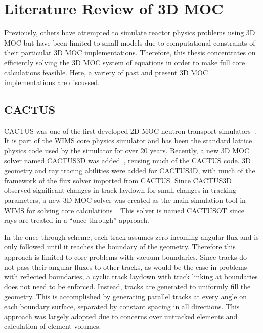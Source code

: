 \section{Literature Review of 3D MOC}
\label{sec:lit-review}

Previously, others have attempted to simulate reactor physics problems using 3D \ac{MOC} but have been limited to small models due to computational constraints of their particular 3D \ac{MOC} implementations. Therefore, this thesis concentrates on efficiently solving the 3D \ac{MOC} system of equations in order to make full core calculations feasible. Here, a variety of past and present 3D \ac{MOC} implementations are discussed.

\subsection{CACTUS}
\label{sec:cactus}

CACTUS was one of the first developed 2D \ac{MOC} neutron transport simulators~\cite{cactus_2d}. It is part of the WIMS core physics simulator and has been the standard lattice physics code used by the simulator for over 20 years. Recently, a new 3D \ac{MOC} solver named CACTUS3D was added~\cite{cactus_3d}, reusing much of the CACTUS code. 3D geometry and ray tracing abilities were added for CACTUS3D, with much of the framework of the flux solver imported from CACTUS. Since CACTUS3D observed significant changes in track laydown for small changes in tracking parameters, a new 3D \ac{MOC} solver was created as the main simulation tool in WIMS for solving core calculations~\cite{cactus_wims}. This solver is named  CACTUSOT since rays are treated in a ``once-through'' approach.

In the once-through scheme, each track assumes zero incoming angular flux and is only followed until it reaches the boundary of the geometry. Therefore this approach is limited to core problems with vacuum boundaries. Since tracks do not pass their angular fluxes to other tracks, as would be the case in problems with reflected boundaries, a cyclic track laydown with track linking at boundaries does not need to be enforced. Instead, tracks are generated to uniformly fill the geometry. This is accomplished by generating parallel tracks at every angle on each boundary surface, separated by constant spacing in all directions. This approach was largely adopted due to concerns over untracked elements and calculation of element volumes.

